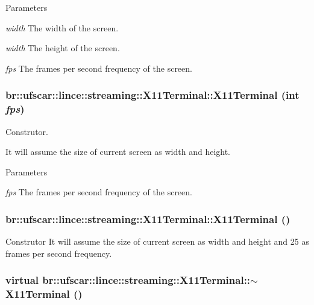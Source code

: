 \begin{DoxyParams}{Parameters}
\item[{\em width}]The width of the screen. \item[{\em width}]The height of the screen. \item[{\em fps}]The frames per second frequency of the screen. \end{DoxyParams}
\hypertarget{classbr_1_1ufscar_1_1lince_1_1streaming_1_1X11Terminal_ade5b6ffc05bc6012ea5616812320e51e}{
\subsubsection[{X11Terminal}]{\setlength{\rightskip}{0pt plus 5cm}br::ufscar::lince::streaming::X11Terminal::X11Terminal (int {\em fps})}}
\label{classbr_1_1ufscar_1_1lince_1_1streaming_1_1X11Terminal_ade5b6ffc05bc6012ea5616812320e51e}


Construtor. 

It will assume the size of current screen as width and height. 
\begin{DoxyParams}{Parameters}
\item[{\em fps}]The frames per second frequency of the screen. \end{DoxyParams}
\hypertarget{classbr_1_1ufscar_1_1lince_1_1streaming_1_1X11Terminal_a917bccc807324e153eabb87bc5dcc8e9}{
\subsubsection[{X11Terminal}]{\setlength{\rightskip}{0pt plus 5cm}br::ufscar::lince::streaming::X11Terminal::X11Terminal ()}}
\label{classbr_1_1ufscar_1_1lince_1_1streaming_1_1X11Terminal_a917bccc807324e153eabb87bc5dcc8e9}


Construtor It will assume the size of current screen as width and height and 25 as frames per second frequency. 

\hypertarget{classbr_1_1ufscar_1_1lince_1_1streaming_1_1X11Terminal_af2ad9a116dcaf89650ad95703fc1db09}{
\subsubsection[{$\sim$X11Terminal}]{\setlength{\rightskip}{0pt plus 5cm}virtual br::ufscar::lince::streaming::X11Terminal::$\sim$X11Terminal ()}}
\label{classbr_1_1ufscar_1_1lince_1_1streaming_1_1X11Terminal_af2ad9a116dcaf89650ad95703fc1db09}


